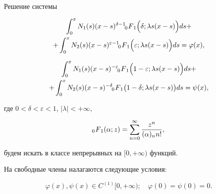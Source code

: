 Решение системы

\begin{multline}

\int _0^x N_1(s) (x-s)^{\delta-1}  \,\,

F_{\hspace{-4mm}0 \hspace{3mm}1} \Bigl(\delta;\lambda s (x-s)\Bigr)ds +

\\

\label{dolg:eq5}

+\int _0^x N_2(s) (x-s)^{\varepsilon-1}  \,\,

F_{\hspace{-4mm}0 \hspace{3mm}1} \Bigl(\varepsilon;\lambda s (x-s)\Bigr)ds = \varphi(x),

\end{multline}

\begin{multline}

 \int _0^x N_1(s) (x-s)^{-\varepsilon}  \,\,

F_{\hspace{-4mm}0 \hspace{3mm}1} \Bigl(1-\varepsilon;\lambda s (x-s)\Bigr)ds + \\

\label{dolg:eq6}

+ \int _0^x N_2(s) (x-s)^{-\delta}  \,\,

F_{\hspace{-4mm}0 \hspace{3mm}1} \bigl(1-\delta; \lambda s (x-s)\bigr)ds = \psi(x),

\end{multline}

где $0<\delta<\varepsilon<1$, $|\lambda|<+\infty$, 

$$\,\,

F_{\hspace{-4mm}0 \hspace{3mm}1} (\alpha; z )=\sum\limits_{n=0}^\infty \frac{z^n}{(\alpha)_n n!},$$ 

будем искать в классе непрерывных на $[0,+\infty)$ функций. 

На свободные члены налагаются следующие условия:

\begin{equation}\label{dolg:eq7}

\varphi(x), \psi(x) \in C^{(1)}[0,+\infty); \quad \varphi(0) = \psi(0) =0.

\end{equation}



